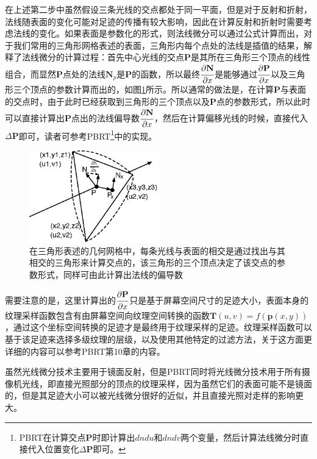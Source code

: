 在上述第二步中虽然假设三条光线的交点都处于同一平面，但是对于反射和折射，法线随表面的变化可能对足迹的传播有较大影响，因此在计算反射和折射时需要考虑法线的变化。如果表面是参数化的形式，则法线微分可以通过公式计算而出，对于我们常用的三角形网格表述的表面，三角形内每个点处的法线是插值的结果，\cite{a:TracingRayDifferentials}解释了法线微分的计算过程：首先中心光线的交点$\mathbf{P}$是其所在三角形三个顶点的线性组合，而显然$\mathbf{P}$点处的法线$\mathbf{N}_p$是$\mathbf{P}$的函数，所以最终$ \cfrac{{\rm \partial} \mathbf{N}}{{\rm \partial} x}$是能够通过$ \cfrac{{\rm \partial} \mathbf{P}}{{\rm \partial} x}$以及三角形三个顶点的参数计算而出的，如图\ref{f:pt-mapping}所示。所以通常的做法是，在计算$\mathbf{P}$与表面的交点时，由于此时已经获取到三角形的三个顶点以及$\mathbf{P}$点的参数形式，所以此时可以直接计算出$\mathbf{P}$点出的法线偏导数$ \cfrac{{\rm \partial} \mathbf{N}}{{\rm \partial} x}$，然后在计算偏移光线的时候，直接代入$\Delta\mathbf{P}$即可，读者可参考PBRT\footnote{PBRT在计算交点$\mathbf{P}$时即计算出$dndu$和$dndv$两个变量，然后计算法线微分时直接代入位置变化$\Delta\mathbf{P}$即可。}中的实现。

\begin{figure}
	\sidecaption
	\includegraphics[width=0.5\textwidth]{figures/pt/mapping}
	\caption{在三角形表述的几何网格中，每条光线与表面的相交是通过找出与其相交的三角形来计算交点的，该三角形的三个顶点决定了该交点的参数形式，同样可由此计算出法线的偏导数}
	\label{f:pt-mapping}
\end{figure}



需要注意的是，这里计算出的$ \cfrac{{\rm \partial} \mathbf{P}}{{\rm \partial} x}$只是基于屏幕空间尺寸的足迹大小，表面本身的纹理采样函数包含有由屏幕空间向纹理空间转换的函数$\mathbf{T}(u,v)=f(\mathbf{p}(x,y))$，通过这个坐标空间转换的足迹才是最终用于纹理采样的足迹。纹理采样函数可以基于该足迹来选择多级纹理的层级，以及使用其他特定的过滤方法，关于这方面更详细的内容可以参考PBRT\cite{b:pbrt}第10章的内容。

虽然光线微分技术主要用于镜面反射，但是PBRT同时将光线微分技术用于所有摄像机光线，即直接光照部分的顶点的纹理采样，因为虽然它们的表面可能不是镜面的，但是其足迹大小可以被光线微分很好的近似，并且直接光照对走样的影响更大。

